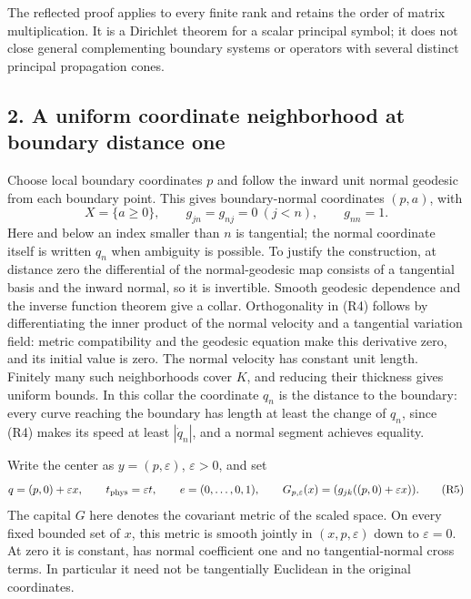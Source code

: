 \documentclass[
  11pt,
]{article}
\begin{document}
The reflected proof applies to every finite rank and retains the order
of matrix multiplication. It is a Dirichlet theorem for a scalar
principal symbol; it does not close general complementing boundary
systems or operators with several distinct principal propagation cones.

\subsection{2. A uniform coordinate neighborhood at boundary distance
one}\label{a-uniform-coordinate-neighborhood-at-boundary-distance-one}

Choose local boundary coordinates \(p\) and follow the inward unit
normal geodesic from each boundary point. This gives boundary-normal
coordinates \((p,a)\), with \[
 X=\{a\geq0\},\qquad g_{jn}=g_{nj}=0\ (j<n),\qquad g_{nn}=1.
                                                               \tag{R4}
\] Here and below an index smaller than \(n\) is tangential; the normal
coordinate itself is written \(q_n\) when ambiguity is possible. To
justify the construction, at distance zero the differential of the
normal-geodesic map consists of a tangential basis and the inward
normal, so it is invertible. Smooth geodesic dependence and the inverse
function theorem give a collar. Orthogonality in (R4) follows by
differentiating the inner product of the normal velocity and a
tangential variation field: metric compatibility and the geodesic
equation make this derivative zero, and its initial value is zero. The
normal velocity has constant unit length. Finitely many such
neighborhoods cover \(K\), and reducing their thickness gives uniform
bounds. In this collar the coordinate \(q_n\) is the distance to the
boundary: every curve reaching the boundary has length at least the
change of \(q_n\), since (R4) makes its speed at least \(|\dot q_n|\),
and a normal segment achieves equality.

Write the center as \(y=(p,\varepsilon)\), \(\varepsilon>0\), and set \[
 q=(p,0)+\varepsilon x,\qquad t_{\rm phys}=\varepsilon t,
 \qquad e=(0,\ldots,0,1),
 \qquad G_{p,\varepsilon}(x)=(g_{jk}((p,0)+\varepsilon x)).       \tag{R5}
\] The capital \(G\) here denotes the covariant metric of the scaled
space. On every fixed bounded set of \(x\), this metric is smooth
jointly in \((x,p,\varepsilon)\) down to \(\varepsilon=0\). At zero it
is constant, has normal coefficient one and no tangential-normal cross
terms. In particular it need not be tangentially Euclidean in the
original coordinates.
\end{document}
